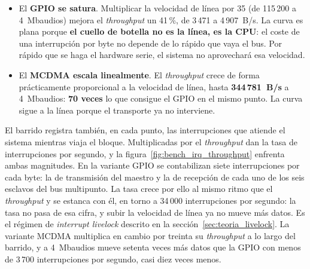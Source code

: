 \begin{itemize}
    \item El \textbf{GPIO se satura}. Multiplicar la velocidad de línea por 35 (de 115\,200 a
    4~Mbaudios) mejora el \textit{throughput} un 41\,\%, de 3\,471 a 4\,907~B/s. La curva es
    plana porque \textbf{el cuello de botella no es la línea, es la CPU}: el coste de una
    interrupción por byte no depende de lo rápido que vaya el bus. Por rápido que se haga el
    hardware serie, el sistema no aprovechará esa velocidad.

    \item El \textbf{MCDMA escala linealmente}. El \textit{throughput} crece de forma
    prácticamente proporcional a la velocidad de línea, hasta \textbf{344\,781~B/s} a
    4~Mbaudios: \textbf{70 veces} lo que consigue el GPIO en el mismo punto. La curva sigue a la
    línea porque el transporte ya no interviene.
\end{itemize}

El barrido registra también, en cada punto, las interrupciones que atiende el sistema mientras
viaja el bloque. Multiplicadas por el \textit{throughput} dan la tasa de interrupciones por
segundo, y la figura~\ref{fig:bench_irq_throughput} enfrenta ambas magnitudes. En la variante GPIO
se contabilizan siete interrupciones por cada byte: la de transmisión del maestro y la de
recepción de cada uno de los seis esclavos del bus multipunto. La tasa crece por ello al mismo
ritmo que el \textit{throughput} y se estanca con él, en torno a 34\,000 interrupciones por
segundo: la tasa no pasa de esa cifra, y subir la velocidad de línea ya no mueve más datos. Es el
régimen de \textit{interrupt livelock} descrito en la sección~\ref{sec:teoria_livelock}. La
variante MCDMA multiplica en cambio por treinta su \textit{throughput} a lo largo del barrido, y a
4~Mbaudios mueve setenta veces más datos que la GPIO con menos de 3\,700 interrupciones por
segundo, casi diez veces menos.

